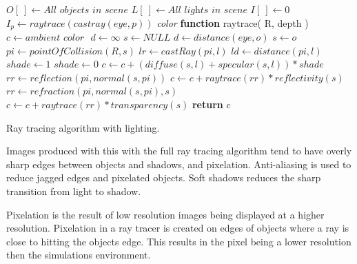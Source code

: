 \begin{algorithm}[H]
\begin{algorithmic}[1]
\STATE $O[\ ] \gets \textit{All objects in scene}$ 
\STATE $L[\ ] \gets \textit{All lights in scene}$
\STATE $I[\ ] \gets 0$ 
\STATE
{}
	\STATE $I_{p} \gets raytrace( castray( eye, p ))$
\ENDFOR
\STATE 
\STATE \textit{color} \textbf{function} raytrace(  R, depth )
	\STATE $c  \gets \textit{ambient color } $
	\STATE $d \gets \infty $
	\STATE $s \gets \textit{NULL}$
				\STATE $d \gets distance( \textit{eye}, o )$
				\STATE $s \gets o$
			\ENDIF
		\ENDIF
	\ENDFOR
		\STATE {}
		\STATE $pi \gets pointOfCollision( R, s )$
			\STATE $lr \gets castRay( pi, l )$
			\STATE $ld \gets distance( pi, l )$
			\STATE $shade \gets 1$
					\STATE $shade \gets 0$				
				\ENDIF
				\STATE $c \gets c +( diffuse( s, l ) + specular( s, l )) * shade$ 
			\ENDFOR
		\ENDFOR
		\STATE {}
			\STATE $rr \gets reflection( pi, normal( s, pi ))$
			\STATE $c \gets c + raytrace( rr ) * reflectivity( s )$
		\ENDIF
		\STATE {}
			\STATE $rr \gets refraction( pi, normal( s, pi ), s )$
			\STATE $c \gets c + raytrace( rr ) * transparency( s )$
		\ENDIF
	\ENDIF
	\STATE \textbf{return} c

\end{algorithmic}
\caption{ Ray tracing algorithm with lighting. }
\label{ray-trace-full}
\end{algorithm}
\newpage

Images produced with this with the full ray tracing algorithm tend to have overly sharp edges between objects and shadows, and pixelation.  Anti-aliasing is used to reduce jagged edges and pixelated objects. Soft shadows reduces the sharp transition from light to shadow.

Pixelation is the result of low resolution images being displayed at a higher resolution.  Pixelation in a ray tracer is created on edges of objects where a ray is close to hitting the objects edge.  This results in the pixel being a lower resolution then the simulations environment.

